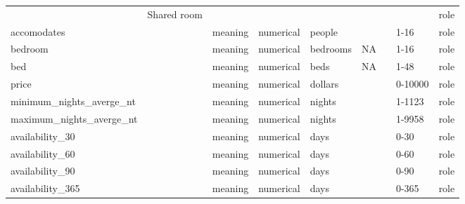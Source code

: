 \begin{center}
\begin{longtable}{@{}lllllllll@{}}
                            & Shared room                 &                                   &             &                &                             &                     &         & role \\
accomodates                 &                             & meaning                           & numerical   & people         &                             &                     & 1-16    & role \\
bedroom                     &                             & meaning                           & numerical   & bedrooms       & NA                          &                     & 1-16    & role \\
bed                         &                             & meaning                           & numerical   & beds           & NA                          &                     & 1-48    & role \\
price                       &                             & meaning                           & numerical   & dollars        &                             &                     & 0-10000 & role \\
minimum\_nights\_averge\_nt &                             & meaning                           & numerical   & nights         &                             &                     & 1-1123  & role \\
maximum\_nights\_averge\_nt &                             & meaning                           & numerical   & nights         &                             &                     & 1-9958  & role \\
availability\_30            &                             & meaning                           & numerical   & days           &                             &                     & 0-30    & role \\
availability\_60            &                             & meaning                           & numerical   & days           &                             &                     & 0-60    & role \\
availability\_90            &                             & meaning                           & numerical   & days           &                             &                     & 0-90    & role \\
availability\_365           &                             & meaning                           & numerical   & days           &                             &                     & 0-365   & role \\

\end{longtable}
\end{center}
